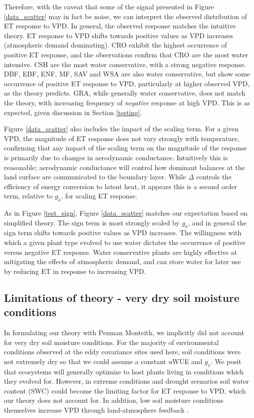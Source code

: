 \documentclass[draft,linenumbers]{agujournal}
\begin{document}
Therefore, with the caveat that some of the signal presented in Figure
\ref{data_scatter} may in fact be noise, we can interpret the observed
distribution of ET response to VPD. In general, the observed response
matches the intuitive theory. ET response to VPD shifts towards
positive values as VPD increases (atmospheric demand dominating). CRO
exhibit the highest occurrence of positive ET response, and the
observations confirm that CRO are the most water intensive. CSH are
the most water conservative, with a strong negative response. DBF,
EBF, ENF, MF, SAV and WSA are also water conservative, but show some
occurrence of positive ET response to VPD, particularly at higher
observed VPD, as the theory predicts. GRA, while generally water
conservative, does not match the theory, with increasing frequency of
\textit{negative} response at high VPD. This is as expected, given
discussion in Section \ref{testing}.

Figure \ref{data_scatter} also includes the impact of the scaling
term. For a given VPD, the magnitude of ET response does not vary
strongly with temperature, confirming that any impact of the scaling
term on the magnitude of the response is primarily due to changes in
aerodynamic conductance. Intuitively this is reasonable; aerodynamic
conductance will control how dominant balances at the land surface are
communicated to the boundary layer. While $\Delta$ controls the
efficiency of energy conversion to latent heat, it appears this is a
second order term, relative to $g_a$, for scaling ET response.

As in Figure \ref{test_sign}, Figure \ref{data_scatter} matches our
expectation based on simplified theory. The sign term is most strongly
scaled by $g_a$, and in general the sign term shifts towards positive
values as VPD increases. The willingness with which a given plant type
evolved to use water dictates the occurrence of positive versus
negative ET response. Water conservative plants are highly effective
at mitigating the effects of atmospheric demand, and can store water
for later use by reducing ET in response to increasing VPD.

\subsection{Limitations of theory - very dry soil moisture conditions}
\label{swc_section}
In formulating our theory with Penman Monteith, we implicitly did not
account for very dry soil moisture conditions. For the majority of
environmental conditions observed at the eddy covariance sites used
here, soil conditions were not extremely dry so that we could assume a
constant uWUE and $g_1$. We posit that ecosystems will generally
optimize to host plants living in conditions which they evolved
for. However, in extreme conditions and drought scenarios soil water
content (SWC) could become the limiting factor for ET response to VPD,
which our theory does not account for. In addition, low soil moisture
conditions themselves increase VPD through land-atmosphere feedback
\citep[][]{Bouchet_1963, Morton_1965, Brutsaert_1999, Ozdogan_2006,
  Salvucci_2013, Gentine_2016, Berg_2016}.
\end{document}
